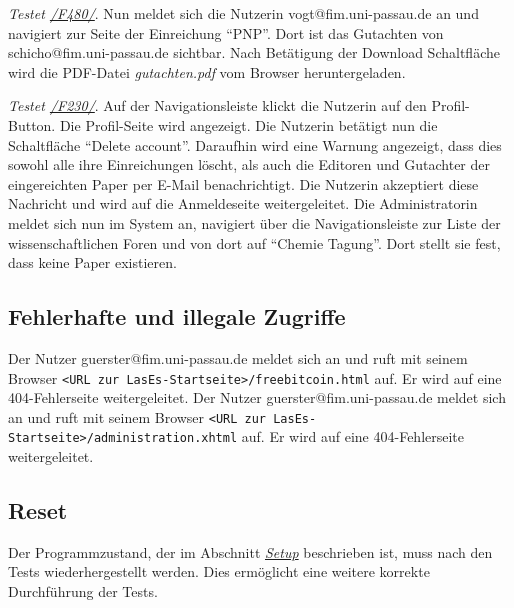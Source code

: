 \begin{description}

	 \emph{Testet \hyperref[funkt:480]{/F480/}}.
	Nun meldet sich die Nutzerin vogt@fim.uni-passau.de an und navigiert zur Seite der Einreichung ``P\neq NP''.
	Dort ist das Gutachten von schicho@fim.uni-passau.de sichtbar.
	Nach Betätigung der Download Schaltfläche wird die PDF-Datei \emph{gutachten.pdf} vom Browser heruntergeladen.

	 \emph{Testet \hyperref[funkt:230]{/F230/}}.
	Auf der Navigationsleiste klickt die Nutzerin auf den Profil-Button.
	Die Profil-Seite wird angezeigt.
	Die Nutzerin betätigt nun die Schaltfläche ``Delete account''.
	Daraufhin wird eine Warnung angezeigt, dass dies sowohl alle ihre Einreichungen löscht, als auch die Editoren und Gutachter der eingereichten Paper per E-Mail benachrichtigt.
	Die Nutzerin akzeptiert diese Nachricht und wird auf die Anmeldeseite weitergeleitet.
	Die Administratorin meldet sich nun im System an, navigiert über die Navigationsleiste zur Liste der wissenschaftlichen Foren und von dort auf ``Chemie Tagung''.
	Dort stellt sie fest, dass keine Paper existieren.

\end{description}

\subsection{Fehlerhafte und illegale Zugriffe}

\begin{description}
	Der Nutzer guerster@fim.uni-passau.de meldet sich an und ruft mit seinem Browser \texttt{<URL zur LasEs-Startseite>/freebitcoin.html} auf.
	Er wird auf eine 404-Fehlerseite weitergeleitet.
	Der Nutzer guerster@fim.uni-passau.de meldet sich an und ruft mit seinem Browser \texttt{<URL zur LasEs-Startseite>/administration.xhtml} auf.
	Er wird auf eine 404-Fehlerseite weitergeleitet.
\end{description}

\subsection{Reset}
Der Programmzustand, der im Abschnitt \emph{\hyperref[setup]{Setup}} beschrieben ist, muss nach den Tests wiederhergestellt werden.
Dies ermöglicht eine weitere korrekte Durchführung der Tests.



